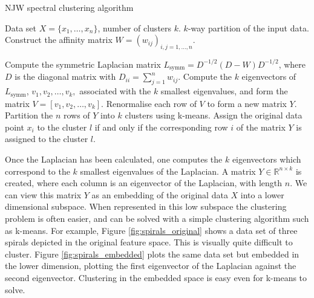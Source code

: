\begin{algorithm}
\caption{NJW spectral clustering algorithm}
\begin{algorithmic}[1]
\REQUIRE Data set $X = \{x_1,\ldots, x_n \}$, number of clusters $k$.
\ENSURE $k$-way partition of the input data.
\STATE Construct the affinity matrix $W = (w_{ij})_{i,j = 1,\ldots, n}.$ %

\STATE Compute the symmetric Laplacian matrix  $L_{\text{symm}} = D^{-1/2}( D - W )D^{-1/2}$, where $D$ is the diagonal matrix with $D_{ii}=\sum_{j=1}^{n} w_{ij}.$
\STATE Compute the $k$ eigenvectors of $L_{\text{symm}}$, $v_1, v_2,\ldots , v_k,$ associated with the $k$ smallest eigenvalues, and form the matrix $ V = [v_1,v_2, \ldots ,v_k]$.
\STATE Renormalise each row of $V$ to form a new matrix $Y$.
\STATE Partition the $n$ rows of $Y$ into $k$ clusters using  k-means.
\STATE Assign the original data point $x_i$ to the cluster $l$ if and only if the corresponding row $i$ of the matrix $Y$ is assigned to the cluster $l$.
\end{algorithmic}
\label{alg:njw}
\end{algorithm}

Once the Laplacian has been calculated, one computes the $k$ eigenvectors which correspond to the $k$ smallest eigenvalues of the Laplacian. A matrix $Y \in \mathbb{R}^{n \times k}$ is created, where each column is an eigenvector of the Laplacian, with length $n$. We can view this matrix $Y$ as an embedding of the original data $X$ into a lower dimensional subspace. When represented in this low subspace the clustering problem is often easier, and can be solved with a simple clustering algorithm such as k-means. For example, Figure \ref{fig:spirals_original} shows a data set of three spirals depicted in the original feature space. This is visually quite difficult to cluster. Figure \ref{fig:spirals_embedded} plots the same data set but embedded in the lower dimension, plotting the first eigenvector of the Laplacian against the second eigenvector. Clustering in the embedded space is easy even for k-means to solve. 


